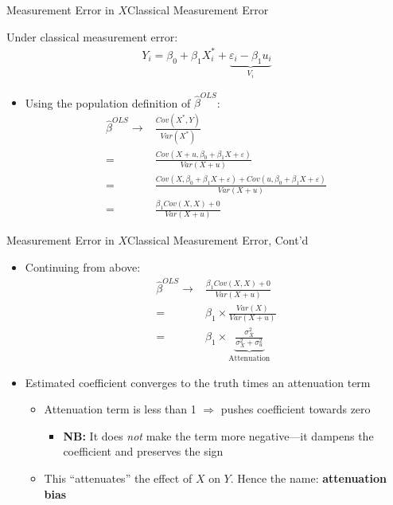 \documentclass[aspectratio=169,11pt]{beamer}
\begin{document}
\begin{frame}{Measurement Error in $X$}{Classical Measurement Error}

Under classical measurement error:
	\begin{align*}
		Y_i = \beta_0 + \beta_1 X_i^* + \underbrace{\varepsilon_i - \beta_1u_i}_{V_i}
	\end{align*}
\begin{itemize}
	\item Using the population definition of $\hat\beta^{OLS}$:{\small
		\begin{align*}
			\hat\beta^{OLS}\to & \frac{Cov(X^*,Y)}{Var(X^*)}\\
							=&\frac{Cov(X+u,\beta_0 + \beta_1 X + \varepsilon)}{Var(X+u)}\\
							=&\frac{Cov(X,\beta_0 + \beta_1 X + \varepsilon) + Cov(u,\beta_0 + \beta_1 X + \varepsilon)}{Var(X+u)}\\
							=& \frac{\beta_1 Cov(X,X) + 0}{Var(X+u)}
		\end{align*}}
\end{itemize}
	
	
\end{frame}

\begin{frame}{Measurement Error in $X$}{Classical Measurement Error, Cont'd}

\begin{itemize}
	\item Continuing from above:{\small
		\begin{align*}
			\hat\beta^{OLS}\to & \frac{\beta_1 Cov(X,X) + 0}{Var(X+u)}\\
							=& \beta_1\times\frac{Var(X)}{Var(X+u)}\\
							=& \beta_1\times\underbrace{\frac{\sigma^2_X}{\sigma^2_X + \sigma^2_u}}_{\text{Attenuation}}
		\end{align*}}
	\item Estimated coefficient converges to the truth times an attenuation term
		\begin{itemize}
			\item Attenuation term is less than 1 $\Rightarrow$ pushes coefficient towards zero
			\begin{itemize}
			\item {\bf NB:} It does \emph{not} make the term more negative---it dampens the coefficient and preserves the sign
			\end{itemize}
			\item This ``attenuates'' the effect of $X$ on $Y$. Hence the name: {\bf attenuation bias}
		\end{itemize}
		
\end{itemize}
	
	
\end{frame}
\end{document}
